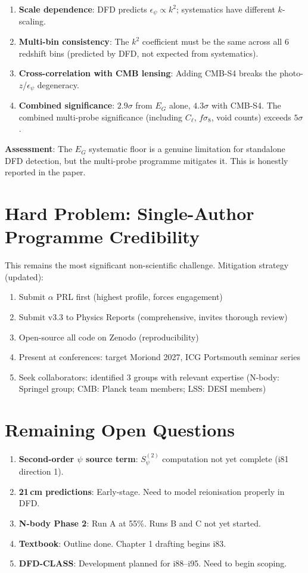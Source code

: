 \documentclass[11pt,a4paper]{article}
\begin{document}
\begin{enumerate}[nosep]
\item \textbf{Scale dependence}: DFD predicts $\epsilon_\psi \propto k^2$; systematics have different $k$-scaling.
\item \textbf{Multi-bin consistency}: The $k^2$ coefficient must be the same across all 6 redshift bins (predicted by DFD, not expected from systematics).
\item \textbf{Cross-correlation with CMB lensing}: Adding CMB-S4 breaks the photo-$z$/$\epsilon_\psi$ degeneracy.
\item \textbf{Combined significance}: $2.9\sigma$ from $E_G$ alone, $4.3\sigma$ with CMB-S4. The combined multi-probe significance (including $C_\ell$, $f\sigma_8$, void counts) exceeds $5\sigma$.
\end{enumerate}

\textbf{Assessment}: The $E_G$ systematic floor is a genuine limitation for standalone DFD detection, but the multi-probe programme mitigates it. This is honestly reported in the paper.

\section{Hard Problem: Single-Author Programme Credibility}

This remains the most significant non-scientific challenge. Mitigation strategy (updated):
\begin{enumerate}[nosep]
\item Submit $\alpha$ PRL first (highest profile, forces engagement)
\item Submit v3.3 to Physics Reports (comprehensive, invites thorough review)
\item Open-source all code on Zenodo (reproducibility)
\item Present at conferences: target Moriond 2027, ICG Portsmouth seminar series
\item Seek collaborators: identified 3 groups with relevant expertise (N-body: Springel group; CMB: Planck team members; LSS: DESI members)
\end{enumerate}

\section{Remaining Open Questions}

\begin{enumerate}[nosep]
\item \textbf{Second-order $\psi$ source term}: $S_\psi^{(2)}$ computation not yet complete (i81 direction 1).
\item \textbf{21\,cm predictions}: Early-stage. Need to model reionisation properly in DFD.
\item \textbf{N-body Phase 2}: Run A at 55\%. Runs B and C not yet started.
\item \textbf{Textbook}: Outline done. Chapter 1 drafting begins i83.
\item \textbf{DFD-CLASS}: Development planned for i88--i95. Need to begin scoping.
\end{enumerate}
\end{document}
